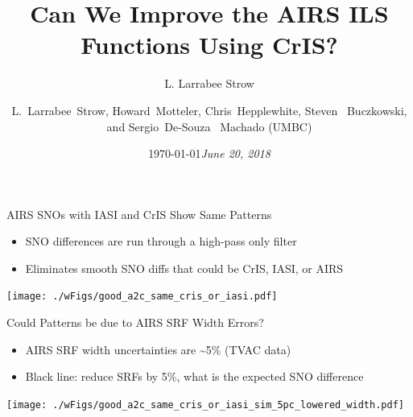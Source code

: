 \documentclass[10pt,t]{beamer}
\author{L. Larrabee Strow}
\date{\today}
\title{\large Can We Improve the AIRS ILS Functions Using CrIS?}
\date{\textit{\footnotesize June 20, 2018}}
\author{L.~Larrabee~Strow, Howard~Motteler, Chris~Hepplewhite, Steven  ~Buczkowski, and Sergio~De-Souza~ Machado (UMBC)}
\begin{document}
\maketitle
{}

\begin{frame}[label={sec:orga895e5d}]{AIRS SNOs with IASI and CrIS Show Same Patterns}
\vspace{-0.1in}
\begin{itemize}
\item SNO differences are run through a high-pass only filter
\item Eliminates smooth SNO diffs that could be CrIS, IASI, or AIRS
\end{itemize}

\begin{center}
\texttt{[image: ./wFigs/good\_a2c\_same\_cris\_or\_iasi.pdf]}
\end{center}
\end{frame}

\begin{frame}[label={sec:orgdfdb9ea}]{Could Patterns be due to AIRS SRF Width Errors?}
\vspace{-0.1in}
\begin{itemize}
\item AIRS SRF width uncertainties are \textasciitilde{}5\% (TVAC data)
\item Black line: reduce SRFs by 5\%, what is the expected SNO difference
\end{itemize}

\begin{center}
\texttt{[image: ./wFigs/good\_a2c\_same\_cris\_or\_iasi\_sim\_5pc\_lowered\_width.pdf]}
\end{center}
\end{frame}
\end{document}

